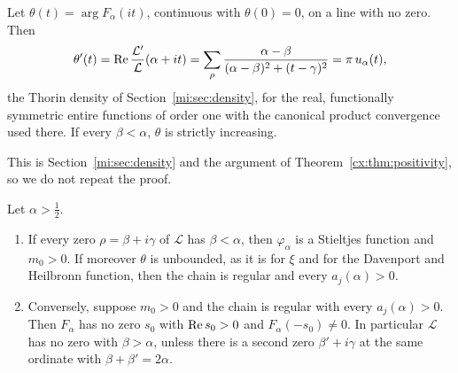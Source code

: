 \begin{lemma}[Phase]\label{h:lem:phase}
Let $\theta(t)=\arg F_\alpha(it)$, continuous with $\theta(0)=0$, on a line with no zero. Then
\[
\theta'(t)=\operatorname{Re}\frac{\mathcal L'}{\mathcal L}(\alpha+it)=\sum_\rho\frac{\alpha-\beta}{(\alpha-\beta)^2+(t-\gamma)^2}=\pi\,u_\alpha(t),
\]
the Thorin density of Section~\ref{mi:sec:density}, for the real, functionally symmetric entire functions of order one with the canonical product convergence used there. If every $\beta<\alpha$, $\theta$ is strictly increasing.
\end{lemma}

This is Section~\ref{mi:sec:density} and the argument of Theorem~\ref{cx:thm:positivity}, so we do not repeat the proof.

\begin{theorem}[Criterion]\label{h:thm:crit}
Let $\alpha>\frac12$.
\begin{enumerate}
\item If every zero $\rho=\beta+i\gamma$ of $\mathcal L$ has $\beta<\alpha$, then $\varphi_\alpha$ is a Stieltjes function and $m_0>0$. If moreover $\theta$ is unbounded, as it is for $\xi$ and for the Davenport and Heilbronn function, then the chain is regular and every $a_j(\alpha)>0$.
\item Conversely, suppose $m_0>0$ and the chain is regular with every $a_j(\alpha)>0$. Then $F_\alpha$ has no zero $s_0$ with $\operatorname{Re} s_0>0$ and $F_\alpha(-s_0)\ne0$. In particular $\mathcal L$ has no zero with $\beta>\alpha$, unless there is a second zero $\beta'+i\gamma$ at the same ordinate with $\beta+\beta'=2\alpha$.
\end{enumerate}
\end{theorem}

